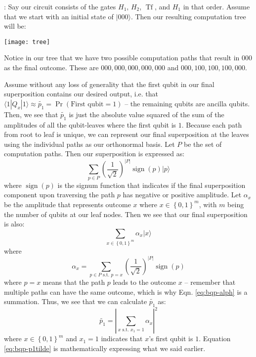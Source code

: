 \documentclass[11pt]{article}
\newcommand{\abs}[1]{\left\lvert #1 \right\rvert}
\newcommand{\set}[1]{\left\{ #1 \right\}}
\newcommand{\tf}{\operatorname{Tf}}
\newcommand{\pr}{\operatorname{Pr}}
\newcommand{\sign}{\operatorname{sign}}
\newcommand{\ket}[1]{\lvert #1 \rangle}
\newcommand{\dbret}[3]{\langle{#1}|{#2}|{#3}\rangle}
\newcommand{\Example}[1]{{\bf Example #1}:}
\def\fill{   \hfill}
\begin{document}
\fill

\noindent \Example{2} Say our circuit consists of the gates $H_1$, $H_2$, $\tf$, and $H_1$ in that order. Assume that we start with an initial state of $\ket{000}$. Then our resulting computation tree will be: %

\texttt{[image: tree]}

\fill

\noindent Notice in our tree that we have two possible computation paths that result in $000$ as the final outcome. These are $000, 000, 000, 000, 000$ and $000, 100, 100, 100, 000$.

\fill

\noindent Assume without any loss of generality that the first qubit in our final superposition contains our desired output, i.e. that $\dbret{1}{Q_x}{1} \approx \widetilde{p_1} = \pr(\text{First qubit} = 1)$ -- the remaining qubits are ancilla qubits. Then, we see that $\widetilde{p_1}$ is just the absolute value squared of the sum of the amplitudes of all the qubit-leaves where the first qubit is $1$. Because each path from root to leaf is unique, we can represent our final superposition at the leaves using the individual paths as our orthonormal basis. Let $P$ be the set of computation paths. Then our superposition is expressed as:
\begin{equation} \label{eq:bqp-psp}
\sum_{p \in P} \left(\frac{1}{\sqrt{2}}\right)^{\abs{P}} \sign(p) \ket{p}
\end{equation}
where $\sign(p)$ is the signum function that indicates if the final superposition component upon traversing the path $p$ has negative or positive amplitude. Let $\alpha_x$ be the amplitude that represents outcome $x$ where $x \in \set{0, 1}^m$, with $m$ being the number of qubits at our leaf nodes. Then we see that our final superposition is also:
\begin{equation} \label{eq:bqp-sp}
\sum_{x \in \set{0, 1}^m} \alpha_x \ket{x}
\end{equation}
where
\begin{equation} \label{eq:bqp-alph}
\alpha_x =  
\sum_{p \in P \text{ s.t. } p = x}  \left(\frac{1}{\sqrt{2}}\right)^{\abs{P}} \sign(p)
\end{equation}
where $p = x$ means that the path $p$ leads to the outcome $x$ -- remember that multiple paths can have the same outcome, which is why Eqn. \ref{eq:bqp-alph} is a summation. Thus, we see that we can calculate $\widetilde{p_1}$ as:
\begin{equation} \label{eq:bqp-p1tilde}
\widetilde{p_1} = \abs{\sum_{x \text{ s.t. } x_1 = 1} \alpha_x}^2
\end{equation}
where $x \in \set{0, 1}^m$ and $x_1 = 1$ indicates that $x$'s first qubit is $1$. Equation \ref{eq:bqp-p1tilde} is mathematically expressing what we said earlier.
\end{document}

